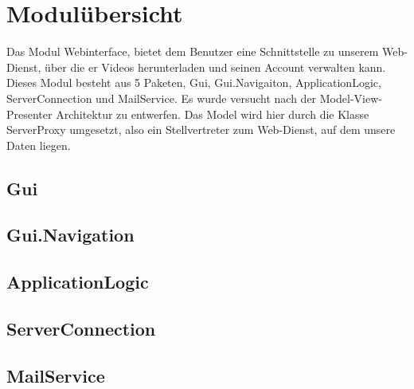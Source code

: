 \section{Modulübersicht} \label{interface:modul}
Das Modul Webinterface, bietet dem Benutzer eine Schnittstelle zu unserem Web-Dienst, über die er Videos herunterladen und seinen Account verwalten kann. Dieses Modul besteht aus 5 Paketen, Gui, Gui.Navigaiton, ApplicationLogic, ServerConnection und MailService. Es wurde versucht nach der Model-View-Presenter Architektur zu entwerfen. Das Model wird hier durch die Klasse ServerProxy umgesetzt, also ein Stellvertreter zum Web-Dienst, auf dem unsere Daten liegen.

\subsection{Gui}

\subsection{Gui.Navigation}

\subsection{ApplicationLogic}

\subsection{ServerConnection}

\subsection{MailService}
\newpage